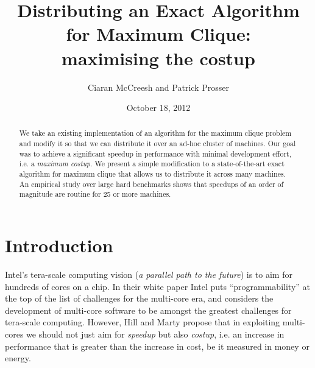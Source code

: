 \documentclass{l4proj}
\begin{document}
\title{Distributing an Exact Algorithm for Maximum Clique:\\
maximising the costup}
\author{Ciaran McCreesh and Patrick Prosser}
\date{October 18, 2012}
\maketitle

\begin{abstract}
We take an existing implementation of an algorithm for the maximum clique
problem and modify it so that we can distribute it over an ad-hoc cluster of machines. 
Our goal was to achieve a significant 
speedup in performance with minimal development effort, i.e. a \emph{maximum costup}. We present a simple 
modification to a state-of-the-art exact algorithm for maximum clique that allows us to distribute it across many machines. 
An empirical study over large hard benchmarks shows that speedups 
of an order of magnitude are routine for 25 or more machines. 
\end{abstract}

\educationalconsent
%
%
\tableofcontents

%
\chapter{Introduction}
\label{sec:intro}
\vspace{-1.5mm}
Intel's tera-scale computing vision (\emph{a parallel path to the future})
is to aim for hundreds of cores on a chip. 
In their white paper \cite{intel2006} Intel puts ``programmability'' at the top of the list of challenges 
for the multi-core era, and considers the development of multi-core software to be amongst the greatest 
challenges for tera-scale computing. However, Hill and Marty \cite{hillMarty}
propose that in exploiting multi-cores we should not just aim for \emph{speedup} but also \emph{costup}, i.e. an increase
in performance that is greater than the increase in cost, be it measured in money or energy.
\end{document}
